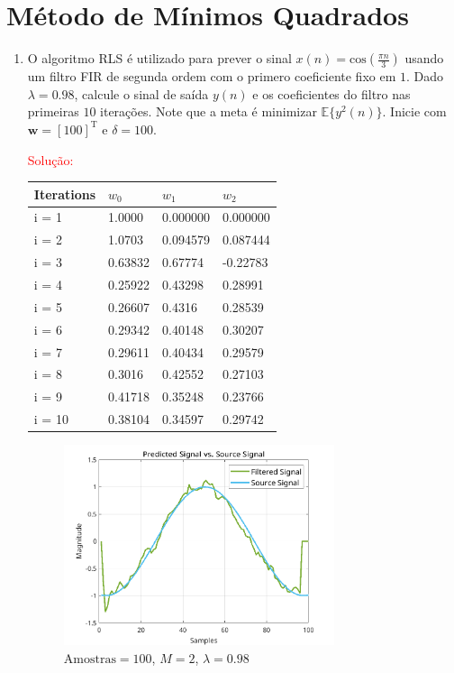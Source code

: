 \documentclass[a4paper,10pt]{article}
\begin{document}
	\newpage
	\section*{Método de Mínimos Quadrados}

		\begin{enumerate}
			
			\item O algoritmo RLS é utilizado para prever o sinal $x(n) = \text{cos} (\frac{\pi n}{3})$ usando um filtro FIR de segunda ordem com o primero 
			coeficiente fixo em $1$. Dado $\lambda = 0.98$, calcule o sinal de saída $y(n)$ e os coeficientes do filtro nas primeiras $10$ iterações. 
			Note que a meta é minimizar $\mathbb{E}\{y^{2}(n)\}$. Inicie com $\boldsymbol{w} = [1 0 0]^{\text{T}}$ e $\delta = 100$.
 
				\textcolor{red}{Solução:}

				\begin{table}[H]
					\centering
					\begin{tabular}{|l|l|l|l|}
						\hline
						Iterations & $w_{0}$ & $w_{1}$ & $w_{2}$ \\ 
						\hline 
						i = 1 & 1.0000 & 0.000000 & 0.000000 \\ \hline
						i = 2 & 1.0703 & 0.094579 & 0.087444 \\ \hline
						i = 3 & 0.63832 & 0.67774 & -0.22783 \\ \hline
						i = 4 & 0.25922 & 0.43298 & 0.28991 \\ \hline
						i = 5 & 0.26607 & 0.4316 & 0.28539 \\ \hline
						i = 6 & 0.29342 & 0.40148 & 0.30207 \\ \hline
						i = 7 & 0.29611 & 0.40434 & 0.29579 \\ \hline
						i = 8 & 0.3016 & 0.42552 & 0.27103 \\ \hline
						i = 9 & 0.41718 & 0.35248 & 0.23766 \\ \hline
						i = 10 & 0.38104 & 0.34597 & 0.29742 \\ \hline 
					\end{tabular}
				\end{table}

				\begin{figure}[H]
					\centering
					\includegraphics[width=0.75\textwidth]{figs/L4Q1.png}
					\caption{$\text{Amostras} = 100$, $M = 2$, $\lambda = 0.98$}
					\label{fig:L4Q1}
				\end{figure}


\end{enumerate}
\end{document}
